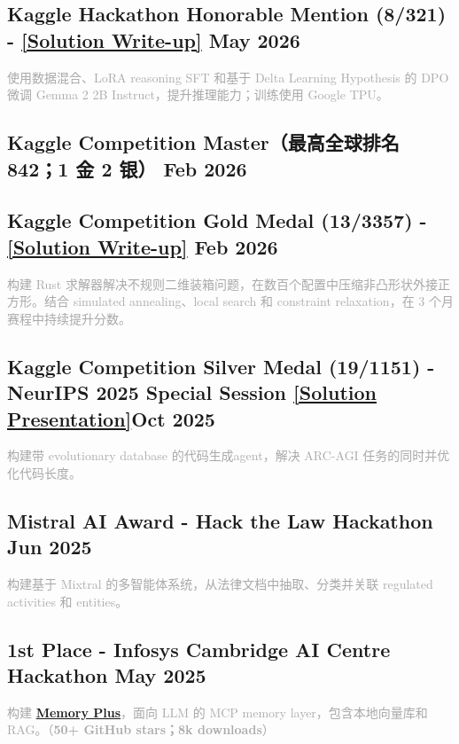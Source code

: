 \vspace{0.3em}
\subsection{{Kaggle Hackathon Honorable Mention
 (8/321) - \href{https://www.kaggle.com/competitions/google-tunix-hackathon/writeups/new-writeup-1763082571151}{[Solution Write-up]} \hfill May 2026}}
\textcolor{darkgray}{
使用数据混合、LoRA reasoning SFT 和基于 Delta Learning Hypothesis 的 DPO 微调 Gemma 2 2B Instruct，提升推理能力；训练使用 Google TPU。
}
\vspace{0.3em}

\subsection{{Kaggle Competition Master（最高全球排名 842；1 金 2 银） \hfill Feb 2026}}
\vspace{0.3em}
\subsection{{Kaggle Competition Gold Medal (13/3357) - \href{https://www.kaggle.com/competitions/santa-2025/writeups/13th-place-santa25-billiard-customized-sparrow}{[Solution Write-up]} \hfill Feb 2026}}
\textcolor{darkgray}{
构建 Rust 求解器解决不规则二维装箱问题，在数百个配置中压缩非凸形状外接正方形。结合 simulated annealing、local search 和 constraint relaxation，在 3 个月赛程中持续提升分数。
}
\vspace{0.3em}
\subsection{{Kaggle Competition Silver Medal (19/1151) - NeurIPS 2025 Special Session \href{https://docs.google.com/presentation/d/1dnbbxxKHlpp_7AG-3h-olI2iJIY0TT0t_pmanXiiiCs/edit?usp=sharing}{[Solution Presentation]}\hfill Oct 2025}}
\textcolor{darkgray}{
构建带 evolutionary database 的代码生成agent，解决 ARC-AGI 任务的同时并优化代码长度。}

\vspace{0.3em}

\subsection{{Mistral AI Award - Hack the Law Hackathon \hfill Jun 2025}}
\textcolor{darkgray}{
构建基于 Mixtral 的多智能体系统，从法律文档中抽取、分类并关联 regulated activities 和 entities。
}
\vspace{0.3em}

\subsection{{1st Place - Infosys Cambridge AI Centre Hackathon \hfill May 2025}}
\textcolor{darkgray}{
构建 \href{https://github.com/Yuchen20/Memory-Plus}{\textbf{Memory Plus}}，面向 LLM 的 MCP memory layer，包含本地向量库和 RAG。（\textbf{50+ GitHub stars；8k downloads}）
}
